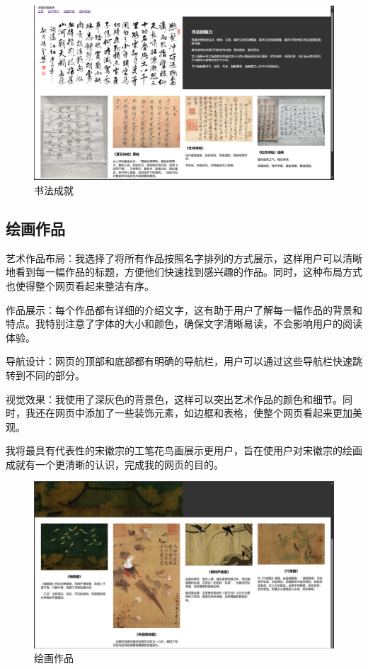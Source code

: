 \documentclass[supercite]{Experimental_Report}
\theoremstyle{definition}
\begin{document}
\begin{figure}[H]
    \centering
    \includegraphics[width=1\linewidth]{./images/书法成就.png}
    \caption{书法成就}
    \label{fig:enter-label}
\end{figure}

\subsection{绘画作品}
\par 艺术作品布局：我选择了将所有作品按照名字排列的方式展示，这样用户可以清晰地看到每一幅作品的标题，方便他们快速找到感兴趣的作品。同时，这种布局方式也使得整个网页看起来整洁有序。
\par 作品展示：每个作品都有详细的介绍文字，这有助于用户了解每一幅作品的背景和特点。我特别注意了字体的大小和颜色，确保文字清晰易读，不会影响用户的阅读体验。
\par 导航设计：网页的顶部和底部都有明确的导航栏，用户可以通过这些导航栏快速跳转到不同的部分。
\par 视觉效果：我使用了深灰色的背景色，这样可以突出艺术作品的颜色和细节。同时，我还在网页中添加了一些装饰元素，如边框和表格，使整个网页看起来更加美观。
\par 我将最具有代表性的宋徽宗的工笔花鸟画展示更用户，旨在使用户对宋徽宗的绘画成就有一个更清晰的认识，完成我的网页的目的。
\begin{figure}
    \centering
    \includegraphics[width=1\linewidth]{./images/绘画作品.png}
    \caption{绘画作品}
    \label{fig:enter-label}
\end{figure}
\end{document}
